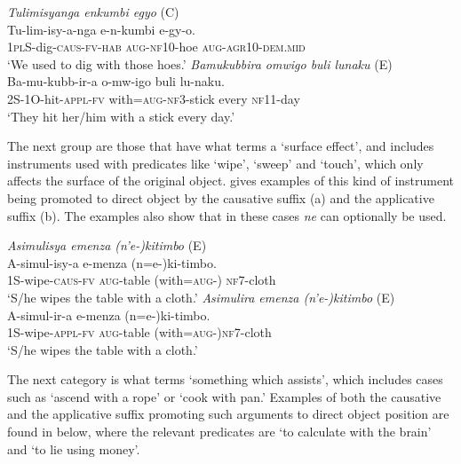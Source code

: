 \documentclass[output=paper,colorlinks,citecolor=brown,draftmode]{langscibook}
\begin{document}
\ea
\begin{xlist}   \label{ex:Saebo:implement}
 \ex \label{ex:Saebo:implementA} \emph{Tulimisyanga 		enkumbi 	egyo} (C)\\
  \gll Tu-lim-isy-a-nga 		e-n-kumbi 	e-gy-o. \\ 
\textsc{1pl}S-dig-\textsc{caus-fv-hab} \textsc{aug-nf10}-hoe \textsc{aug-agr10-dem.mid} \\
    \glt  `We used to dig with those hoes.' 
 \ex \label{ex:Saebo:implementB} \emph{ Bamukubbira 	omwigo 	buli 	lunaku} (E)\\
  \gll   Ba-mu-kubb-ir-a 	o-mw-igo 	buli 	lu-naku. \\ 
2S-1O-hit-\textsc{appl-fv}  with=\textsc{aug-nf3}-stick every \textsc{nf11}-day\\
    \glt  `They hit her/him with a stick every day.' 
      \end{xlist}     
      \z

The next group are those that have what \citet{dixon2010basic} terms a ‘surface effect’, and includes instruments used with predicates like ‘wipe’, ‘sweep’ and ‘touch’, which only affects the surface of the original object.  gives examples of this kind of instrument being promoted to direct object by the causative suffix (a) and the applicative suffix (b). The examples also show that in these cases \emph{ne} can optionally be used. 


\ea
\begin{xlist}   \label{ex:Saebo:surface}

 \ex \label{ex:Saebo:surfaceA} \emph{Asimulisya 		emenza 	(n'e-)kitimbo } (E)\\
  \gll A-simul-isy-a 		e-menza 	(n=e-)ki-timbo.  \\ 
1S-wipe-\textsc{caus-fv} \textsc{aug}-table (with=\textsc{aug-}) \textsc{nf7-}cloth\\
    \glt  `S/he wipes the table with a cloth.' 
     \ex \label{ex:Saebo:surfaceB} \emph{Asimulira 	emenza 	(n'e-)kitimbo} (E) \\
  \gll  A-simul-ir-a 		e-menza 	(n=e-)ki-timbo. \\ 
1S-wipe-\textsc{appl-fv} \textsc{aug}-table (with=\textsc{aug-})\textsc{nf7-}cloth \\
    \glt  `S/he wipes the table with a cloth.' 
      \end{xlist}     
      \z

The next category is what \citet{dixon2010basic} terms `something which assists’, which includes cases such as `ascend with a rope’ or `cook with pan.' Examples of both the causative and the applicative suffix promoting such arguments to direct object position are found in  below, where the relevant predicates are `to calculate with the brain' and `to lie using money'. 
\end{document}
